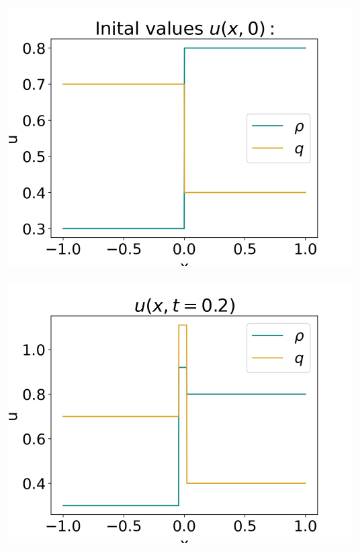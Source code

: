 \documentclass[10pt]{article}
\numberwithin{equation}{section}
\begin{document}
\begin{figure}
         \centering
     \begin{subfigure}[t]{0.2\textwidth}
         \centering
         \includegraphics[width=\textwidth]{Figures/Model/Plots/SysShockIV.png}
     \end{subfigure}
     \begin{subfigure}[t]{0.2\textwidth}
         \centering
         \includegraphics[width=\textwidth]{Figures/Model/Plots/SysShockAtTime2.png}
     \end{subfigure}
     \begin{subfigure}[t]{0.2\textwidth}
         \centering

\end{subfigure}
\end{figure}
\end{document}
